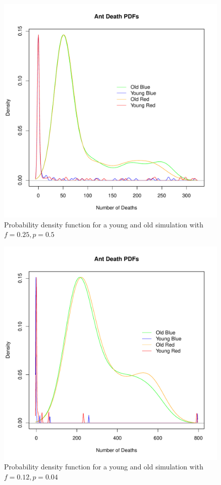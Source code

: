 \begin{enumerate}
\begin{figure}[h!]
\centering
\includegraphics[scale=0.80]{part5regime1v1.pdf}
\caption{Probability density function for a young and old simulation with $f = 0.25, p = 0.5$}
\label{parte1fig}
\end{figure}

\begin{figure}[h!]
\centering
\includegraphics[scale=0.80]{part5regime2v1.pdf}
\caption{Probability density function for a young and old simulation with $f = 
0.12, p = 0.04$}
\label{parte2fig}
\end{figure}


\end{enumerate}
